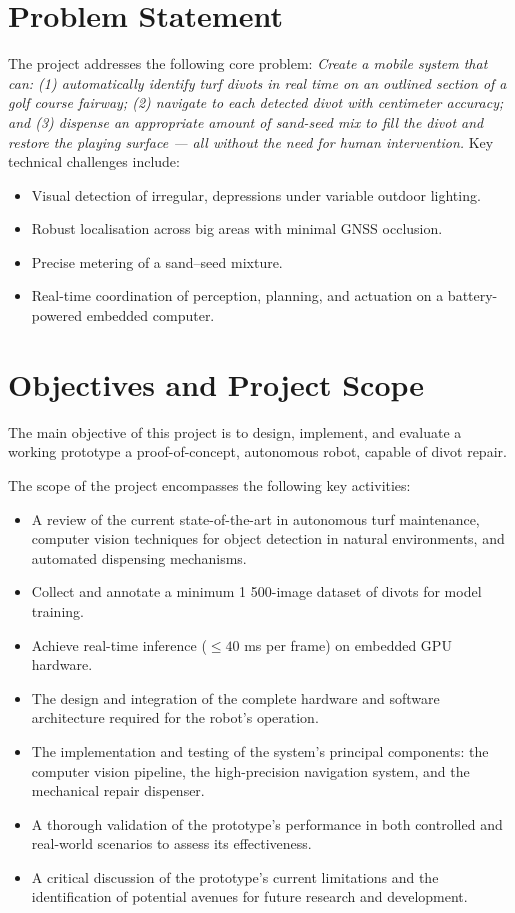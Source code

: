 \section{Problem Statement}
The project addresses the following core problem: \emph{Create a mobile system that can: (1) automatically identify turf divots in real time on an outlined section of a golf course fairway; (2) navigate to each detected divot with centimeter accuracy; and (3) dispense an appropriate amount of sand-seed mix to fill the divot and restore the playing surface — all without the need for human intervention.}
Key technical challenges include:
\begin{itemize}
  \item Visual detection of irregular, depressions under variable outdoor lighting.
  \item Robust localisation across big areas with minimal \gls{GNSS} occlusion.
  \item Precise metering of a sand–seed mixture.
  \item Real-time coordination of perception, planning, and actuation on a battery-powered embedded computer.
\end{itemize}


\section{Objectives and Project Scope}
\label{sec:objectives_scope}
The main objective of this project is to design, implement, and evaluate a working prototype a proof-of-concept, autonomous robot, capable of divot repair.

The scope of the project encompasses the following key activities:
\begin{itemize}
    \item A review of the current state-of-the-art in autonomous turf maintenance, computer vision techniques for object detection in natural environments, and automated dispensing mechanisms.
    \item Collect and annotate a minimum 1 500-image dataset of divots for model training.
    \item Achieve real-time inference ($\le\!40$ ms per frame) on embedded \gls{GPU} hardware.
    \item The design and integration of the complete hardware and software architecture required for the robot's operation.
    \item The implementation and testing of the system's principal components: the computer vision pipeline, the high-precision navigation system, and the mechanical repair dispenser.
    \item A thorough validation of the prototype's performance in both controlled and real-world scenarios to assess its effectiveness.
    \item A critical discussion of the prototype's current limitations and the identification of potential avenues for future research and development.
\end{itemize}

